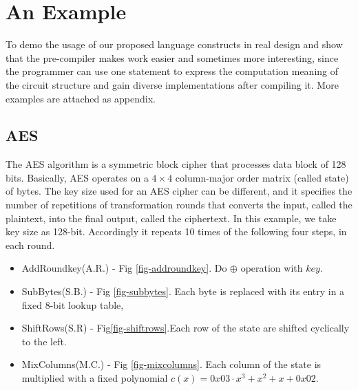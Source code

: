 \section{An Example}\label{sec:examples}
To demo the usage of our proposed language constructs in real design and show that the pre-compiler makes work easier and sometimes more interesting, since the programmer can use one statement to express the computation meaning of the circuit structure and gain diverse implementations after compiling it. More examples are attached as appendix.
\subsection{AES}
The AES\cite{AES} algorithm is a symmetric block cipher that processes data block of 128 bits.
Basically, AES operates on a \begin{math} 4 \times 4 \end{math} column-major order matrix (called state) of bytes. The key size used for an AES cipher can be different, and it specifies the number of repetitions of transformation rounds that converts the input, called the plaintext, into the final output, called the ciphertext. 
In this example, we take key size as 128-bit. Accordingly it repeats 10 times of the following four steps, in each round.
\begin{itemize}
  \item AddRoundkey(A.R.) - Fig \ref{fig-addroundkey}. Do $\oplus$ operation with $key$.
  \item SubBytes(S.B.) - Fig \ref{fig-subbytes}. Each byte is replaced with its entry in a fixed 8-bit 
        lookup table,
  \item ShiftRows(S.R) - Fig\ref{fig-shiftrows}.Each row of the state are shifted cyclically to the 
        left.
  \item MixColumns(M.C.) - Fig \ref{fig-mixcolumns}. Each column of the state is multiplied with a fixed polynomial 
        $c(x) = 0x03\cdot x^3 + x^2 + x + 0x02$.
\end{itemize}
